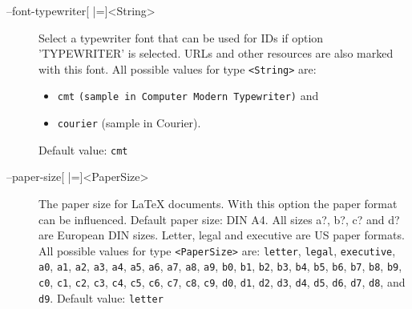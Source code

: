 \begin{description}
\item[--font-typewriter{[} |={]}<String>]
  Select a typewriter font that can be used for \acp{ID} if
  option 'TYPEWRITER' is selected. URLs and other resources are
  also marked with this font.
  All possible values for type \texttt{<String>} are:
  \begin{itemize}
  \item\texttt{cmt} \texttt{(sample in Computer Modern Typewriter)} and
  \item\texttt{courier} {\selectfont (sample in Courier)}.
  \end{itemize}
  Default value: \texttt{cmt}

\item[--paper-size{[} |={]}<PaperSize>]
  The paper size for \LaTeX{} documents. With this option the paper
  format can be influenced. Default paper size: DIN A4. All sizes
  a?, b?, c? and d? are European DIN sizes. Letter, legal and
  executive are US paper formats.
  All possible values for type \texttt{<PaperSize>} are:
  \texttt{letter}, \texttt{legal},
  \texttt{executive}, \texttt{a0},
  \texttt{a1}, \texttt{a2},
  \texttt{a3}, \texttt{a4},
  \texttt{a5}, \texttt{a6},
  \texttt{a7}, \texttt{a8},
  \texttt{a9}, \texttt{b0},
  \texttt{b1}, \texttt{b2},
  \texttt{b3}, \texttt{b4},
  \texttt{b5}, \texttt{b6},
  \texttt{b7}, \texttt{b8},
  \texttt{b9}, \texttt{c0},
  \texttt{c1}, \texttt{c2},
  \texttt{c3}, \texttt{c4},
  \texttt{c5}, \texttt{c6},
  \texttt{c7}, \texttt{c8},
  \texttt{c9}, \texttt{d0},
  \texttt{d1}, \texttt{d2},
  \texttt{d3}, \texttt{d4},
  \texttt{d5}, \texttt{d6},
  \texttt{d7}, \texttt{d8},
  and \texttt{d9}.
  Default value: \texttt{letter}
\end{description}

